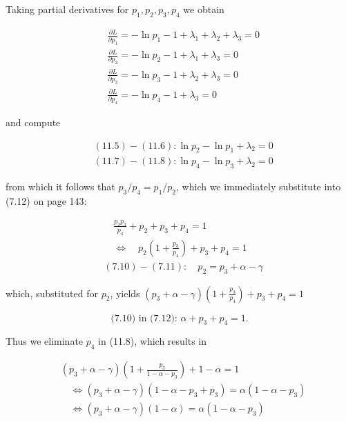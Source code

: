 \documentclass[10pt]{book}
\begin{document}
Taking partial derivatives for $p_{1}, p_{2}, p_{3}, p_{4}$ we obtain


\begin{align*}
& \frac{\partial L}{\partial p_{1}}=-\ln p_{1}-1+\lambda_{1}+\lambda_{2}+\lambda_{3}=0  \tag{11.5}\\
& \frac{\partial L}{\partial p_{2}}=-\ln p_{2}-1+\lambda_{1}+\lambda_{3}=0  \tag{11.6}\\
& \frac{\partial L}{\partial p_{3}}=-\ln p_{3}-1+\lambda_{2}+\lambda_{3}=0  \tag{11.7}\\
& \frac{\partial L}{\partial p_{4}}=-\ln p_{4}-1+\lambda_{3}=0 \tag{11.8}
\end{align*}


and compute


\begin{align*}
& (11.5)-(11.6): \ln p_{2}-\ln p_{1}+\lambda_{2}=0  \tag{11.9}\\
& (11.7)-(11.8): \ln p_{4}-\ln p_{3}+\lambda_{2}=0 \tag{11.10}
\end{align*}


from which it follows that $p_{3} / p_{4}=p_{1} / p_{2}$, which we immediately substitute into (7.12) on page 143:


\begin{align*}
& \quad \frac{p_{2} p_{3}}{p_{4}}+p_{2}+p_{3}+p_{4}=1 \\
& \quad \Leftrightarrow \quad p_{2}\left(1+\frac{p_{3}}{p_{4}}\right)+p_{3}+p_{4}=1  \tag{11.11}\\
& (7.10)-(7.11): \quad p_{2}=p_{3}+\alpha-\gamma
\end{align*}


which, substituted for $p_{2}$, yields $\left(p_{3}+\alpha-\gamma\right)\left(1+\frac{p_{3}}{p_{4}}\right)+p_{3}+p_{4}=1$


\begin{equation*}
\text { (7.10) in (7.12): } \alpha+p_{3}+p_{4}=1 \text {. } \tag{11.12}
\end{equation*}


Thus we eliminate $p_{4}$ in (11.8), which results in


\begin{align*}
& \left(p_{3}+\alpha-\gamma\right)\left(1+\frac{p_{3}}{1-\alpha-p_{3}}\right)+1-\alpha=1  \tag{11.13}\\
& \quad \Leftrightarrow\left(p_{3}+\alpha-\gamma\right)\left(1-\alpha-p_{3}+p_{3}\right)=\alpha\left(1-\alpha-p_{3}\right)  \tag{11.14}\\
& \quad \Leftrightarrow\left(p_{3}+\alpha-\gamma\right)(1-\alpha)=\alpha\left(1-\alpha-p_{3}\right) \tag{11.15}
\end{align*}
\end{document}

